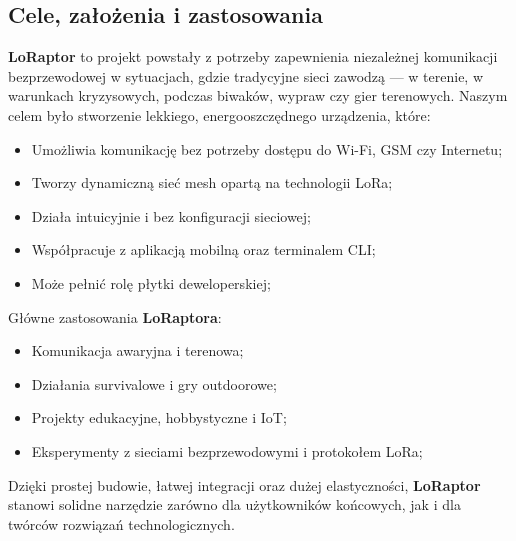 \subsection{Cele, założenia i zastosowania}

\textbf{LoRaptor} to projekt powstały z potrzeby zapewnienia niezależnej komunikacji bezprzewodowej w sytuacjach, gdzie tradycyjne sieci zawodzą --- w terenie, w warunkach kryzysowych, podczas biwaków, wypraw czy gier terenowych.
Naszym celem było stworzenie lekkiego, energooszczędnego urządzenia, które:
\begin{itemize}
	\item Umożliwia komunikację bez potrzeby dostępu do Wi-Fi, GSM czy Internetu;
	\item Tworzy dynamiczną sieć mesh opartą na technologii LoRa;
	\item Działa intuicyjnie i bez konfiguracji sieciowej;
	\item Współpracuje z aplikacją mobilną oraz terminalem CLI;
	\item Może pełnić rolę płytki deweloperskiej;
\end{itemize}
Główne zastosowania \textbf{LoRaptora}:
\begin{itemize}
	\item Komunikacja awaryjna i terenowa;
	\item Działania survivalowe i gry outdoorowe;
	\item Projekty edukacyjne, hobbystyczne i IoT;
	\item Eksperymenty z sieciami bezprzewodowymi i protokołem LoRa;
\end{itemize}
Dzięki prostej budowie, łatwej integracji oraz dużej elastyczności, \textbf{LoRaptor} stanowi solidne narzędzie zarówno dla użytkowników końcowych, jak i dla twórców rozwiązań technologicznych.